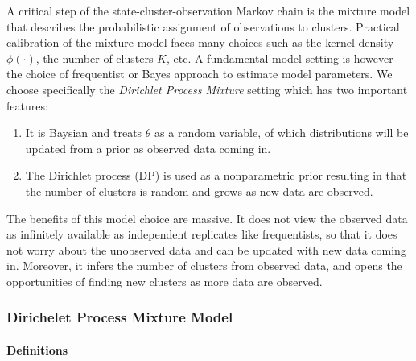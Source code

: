 A critical step of the state-cluster-observation Markov chain is the mixture model that describes the probabilistic assignment of observations to clusters. Practical calibration of the mixture model faces many choices such as the kernel density $\phi(\cdot)$, the number of clusters $K$, etc. A fundamental model setting is however the choice of frequentist or Bayes approach to estimate model parameters. We choose specifically the \textit{Dirichlet Process Mixture} setting which has two important features:
\begin{enumerate}
\item It is Baysian and treats $\theta$ as a random variable, of which distributions will be updated from a prior as observed data coming in. 
\item The Dirichlet process (DP) is used as a nonparametric prior resulting in that the number of clusters is random and grows as new data are observed.
\end{enumerate}
The benefits of this model choice are massive. It does not view the observed data as infinitely available as independent replicates like frequentists, so that it does not worry about the unobserved data and can be updated with new data coming in. Moreover, it infers the number of clusters from observed data, and opens the opportunities of finding new clusters as more data are observed.

\subsubsection{Dirichelet Process Mixture Model}

\paragraph*{Definitions}

